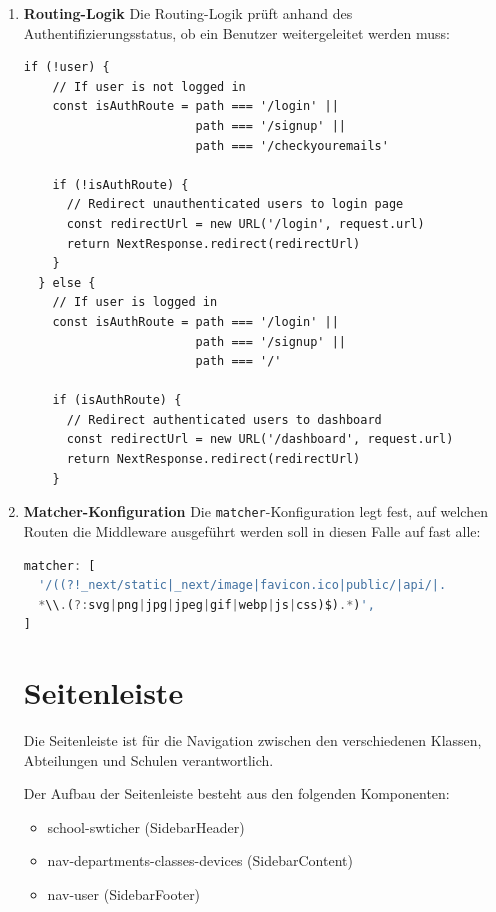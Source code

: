 \begin{inhalt}
\begin{enumerate}[label=\textbf{\arabic*.}]
\newpage

  \item \textbf{Routing-Logik}
  Die Routing-Logik prüft anhand des Authentifizierungsstatus, ob ein Benutzer weitergeleitet werden muss:


\begin{lstlisting}[style=mytsx]
  if (!user) {
    // If user is not logged in
    const isAuthRoute = path === '/login' || 
                        path === '/signup' || 
                        path === '/checkyouremails'
    
    if (!isAuthRoute) {
      // Redirect unauthenticated users to login page
      const redirectUrl = new URL('/login', request.url)
      return NextResponse.redirect(redirectUrl)
    }
  } else {
    // If user is logged in
    const isAuthRoute = path === '/login' || 
                        path === '/signup' || 
                        path === '/'
    
    if (isAuthRoute) {
      // Redirect authenticated users to dashboard
      const redirectUrl = new URL('/dashboard', request.url)
      return NextResponse.redirect(redirectUrl)
    }

  \end{lstlisting}

  \item \textbf{Matcher-Konfiguration}
  Die \texttt{matcher}-Konfiguration legt fest, auf welchen Routen die Middleware ausgeführt werden soll in diesen Falle auf fast alle:

\begin{lstlisting}[language=TypeScript]
matcher: [
  '/((?!_next/static|_next/image|favicon.ico|public/|api/|.
  *\\.(?:svg|png|jpg|jpeg|gif|webp|js|css)$).*)',
]


\end{lstlisting}



\clearpage

\newpage

\section{Seitenleiste}

Die Seitenleiste ist für die Navigation zwischen den verschiedenen Klassen, Abteilungen und Schulen verantwortlich.  

Der Aufbau der Seitenleiste besteht aus den folgenden Komponenten:

\begin{itemize}
    \item school-swticher (SidebarHeader)
    \item nav-departments-classes-devices (SidebarContent)
    \item nav-user (SidebarFooter)
\end{itemize}


\end{enumerate}
\end{inhalt}

